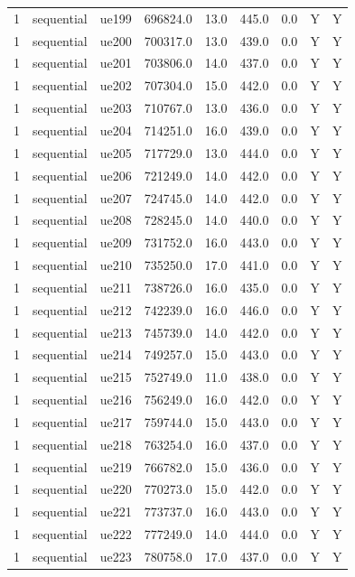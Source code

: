 \begin{table}[ht]
\begin{tabular}{|c|c|c|c|c|c|c|c|c|}
1 & sequential & ue199 & 696824.0 & 13.0 & 445.0 & 0.0 & Y & Y \\
1 & sequential & ue200 & 700317.0 & 13.0 & 439.0 & 0.0 & Y & Y \\
1 & sequential & ue201 & 703806.0 & 14.0 & 437.0 & 0.0 & Y & Y \\
1 & sequential & ue202 & 707304.0 & 15.0 & 442.0 & 0.0 & Y & Y \\
1 & sequential & ue203 & 710767.0 & 13.0 & 436.0 & 0.0 & Y & Y \\
1 & sequential & ue204 & 714251.0 & 16.0 & 439.0 & 0.0 & Y & Y \\
1 & sequential & ue205 & 717729.0 & 13.0 & 444.0 & 0.0 & Y & Y \\
1 & sequential & ue206 & 721249.0 & 14.0 & 442.0 & 0.0 & Y & Y \\
1 & sequential & ue207 & 724745.0 & 14.0 & 442.0 & 0.0 & Y & Y \\
1 & sequential & ue208 & 728245.0 & 14.0 & 440.0 & 0.0 & Y & Y \\
1 & sequential & ue209 & 731752.0 & 16.0 & 443.0 & 0.0 & Y & Y \\
1 & sequential & ue210 & 735250.0 & 17.0 & 441.0 & 0.0 & Y & Y \\
1 & sequential & ue211 & 738726.0 & 16.0 & 435.0 & 0.0 & Y & Y \\
1 & sequential & ue212 & 742239.0 & 16.0 & 446.0 & 0.0 & Y & Y \\
1 & sequential & ue213 & 745739.0 & 14.0 & 442.0 & 0.0 & Y & Y \\
1 & sequential & ue214 & 749257.0 & 15.0 & 443.0 & 0.0 & Y & Y \\
1 & sequential & ue215 & 752749.0 & 11.0 & 438.0 & 0.0 & Y & Y \\
1 & sequential & ue216 & 756249.0 & 16.0 & 442.0 & 0.0 & Y & Y \\
1 & sequential & ue217 & 759744.0 & 15.0 & 443.0 & 0.0 & Y & Y \\
1 & sequential & ue218 & 763254.0 & 16.0 & 437.0 & 0.0 & Y & Y \\
1 & sequential & ue219 & 766782.0 & 15.0 & 436.0 & 0.0 & Y & Y \\
1 & sequential & ue220 & 770273.0 & 15.0 & 442.0 & 0.0 & Y & Y \\
1 & sequential & ue221 & 773737.0 & 16.0 & 443.0 & 0.0 & Y & Y \\
1 & sequential & ue222 & 777249.0 & 14.0 & 444.0 & 0.0 & Y & Y \\
1 & sequential & ue223 & 780758.0 & 17.0 & 437.0 & 0.0 & Y & Y \\

\end{tabular}
\end{table}

